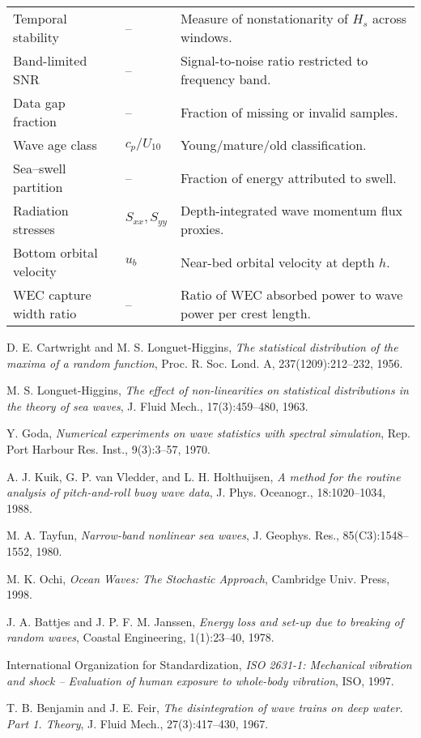\documentclass[11pt]{article}
\begin{document}
\begin{longtable}{|l|l|p{8cm}|}
\hline
Temporal stability & -- & Measure of nonstationarity of $H_s$ across windows. \\
Band-limited SNR & -- & Signal-to-noise ratio restricted to frequency band. \\
Data gap fraction & -- & Fraction of missing or invalid samples. \\
\hline
Wave age class & $c_p/U_{10}$ & Young/mature/old classification. \\
Sea–swell partition & -- & Fraction of energy attributed to swell. \\
Radiation stresses & $S_{xx},S_{yy}$ & Depth-integrated wave momentum flux proxies. \\
\hline
Bottom orbital velocity & $u_b$ & Near-bed orbital velocity at depth $h$. \\
WEC capture width ratio & -- & Ratio of WEC absorbed power to wave power per crest length. \\
\end{longtable}

\begin{thebibliography}{9}
D. E. Cartwright and M. S. Longuet-Higgins,
\textit{The statistical distribution of the maxima of a random function},
Proc. R. Soc. Lond. A, 237(1209):212–232, 1956.

M. S. Longuet-Higgins,
\textit{The effect of non-linearities on statistical distributions in the theory of sea waves},
J. Fluid Mech., 17(3):459–480, 1963.

Y. Goda,
\textit{Numerical experiments on wave statistics with spectral simulation},
Rep. Port Harbour Res. Inst., 9(3):3–57, 1970.

A. J. Kuik, G. P. van Vledder, and L. H. Holthuijsen,
\textit{A method for the routine analysis of pitch-and-roll buoy wave data},
J. Phys. Oceanogr., 18:1020–1034, 1988.

M. A. Tayfun,
\textit{Narrow-band nonlinear sea waves},
J. Geophys. Res., 85(C3):1548–1552, 1980.

M. K. Ochi,
\textit{Ocean Waves: The Stochastic Approach},
Cambridge Univ. Press, 1998.

J. A. Battjes and J. P. F. M. Janssen,
\textit{Energy loss and set-up due to breaking of random waves},
Coastal Engineering, 1(1):23--40, 1978.

International Organization for Standardization,
\textit{ISO 2631-1: Mechanical vibration and shock -- Evaluation of human exposure to whole-body vibration},
ISO, 1997.

T. B. Benjamin and J. E. Feir,
\textit{The disintegration of wave trains on deep water. Part 1. Theory},
J. Fluid Mech., 27(3):417--430, 1967.
\end{thebibliography}
\end{document}
